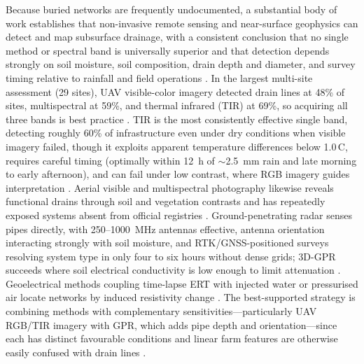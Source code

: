Because buried networks are frequently undocumented, a substantial body of work
establishes that non-invasive remote sensing and near-surface geophysics can
detect and map subsurface drainage, with a consistent conclusion that no single
method or spectral band is universally superior and that detection depends
strongly on soil moisture, soil composition, drain depth and diameter, and
survey timing relative to rainfall and field operations
\parencite{Carlsen2024,Wienken2024,Koganti2021}. In the largest multi-site
assessment (29 sites), UAV visible-color imagery detected drain lines at 48\%
of sites, multispectral at 59\%, and thermal infrared (TIR) at 69\%, so
acquiring all three bands is best practice \parencite{Allred2020}. TIR is the
most consistently effective single band, detecting roughly 60\% of
infrastructure even under dry conditions when visible imagery failed, though it
exploits apparent temperature differences below 1.0\,\textdegree C, requires
careful timing (optimally within 12~h of $\sim$2.5~mm rain and late morning to
early afternoon), and can fail under low contrast, where RGB imagery guides
interpretation
\parencite{Allred2018,Woo2019,Allred2021,Allred2022,Kratt2020}. Aerial visible
and multispectral photography likewise reveals functional drains through soil
and vegetation contrasts and has repeatedly exposed systems absent from
official registries \parencite{Tlapáková2017}. Ground-penetrating radar senses
pipes directly, with 250--1000~MHz antennas effective, antenna orientation
interacting strongly with soil moisture, and RTK/GNSS-positioned surveys
resolving system type in only four to six hours without dense grids; 3D-GPR
succeeds where soil electrical conductivity is low enough to limit attenuation
\parencite{Allred2005,Allred2013,Allred2018b,Koganti2020}. Geoelectrical
methods coupling time-lapse ERT with injected water or pressurised air locate
networks by induced resistivity change
\parencite{Jouen2018,Henine2021}. The best-supported strategy is combining
methods with complementary sensitivities---particularly UAV RGB/TIR imagery
with GPR, which adds pipe depth and orientation---since each has distinct
favourable conditions and linear farm features are otherwise easily confused
with drain lines \parencite{Koganti2021,Carlsen2024,Wienken2024,Allred2020}.

